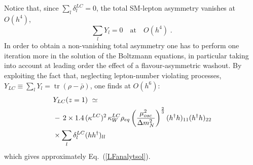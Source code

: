 \documentclass[prd,twocolumn,superscriptaddress,preprintnumbers,nofootinbib,
noshowpacs,groupedaddress]{revtex4-1} %
\DeclareMathOperator{\tr}{tr}
\begin{document}
\begin{appendix}
\begin{equation}
\end{equation}
Notice that, since $\sum_l \delta^{LC}_l = 0$, the total SM-lepton asymmetry vanishes at $O(h^4)$,
\begin{equation}
\sum_l Y_l =  0 \quad \text{at} \quad O(h^4) \;.
\end{equation}
In order to obtain a non-vanishing total asymmetry one has to perform one iteration more in the solution of the Boltzmann equations, in particular taking into account at leading order the effect of a flavour-asymmetric washout. By exploiting the fact that, neglecting lepton-number violating processes, $Y_{LC} \equiv \sum_l Y_l= \tr(\rho - \bar \rho)$, one finds at $O(h^6)$:
\begin{align}
&Y_{LC}(z=1) \ \simeq \notag\\ \ &- \, 2 \times 1.4 \,(\kappa^{LC})^2 \, \kappa^{LC}_W \rho_{eq} \,  \bigg(\frac{\mu^2_{osc}}{\Delta m^2_N}\bigg)^{\frac{2}{3}} \, (h^\dag h)_{11} (h^\dag h)_{22} \, \notag\\
&\times \sum_l \delta_l^{LC} (h h^\dag)_{ll} 
\end{align}
which gives approximately Eq.~(\ref{LFanalytsol}).



\end{appendix}
\end{document}
